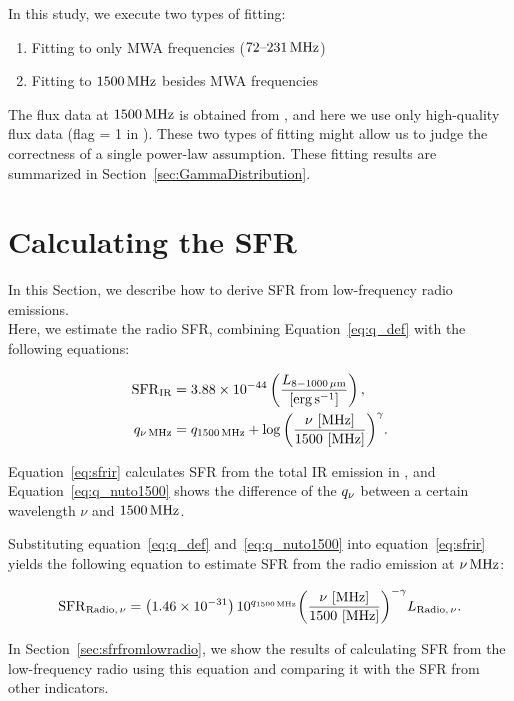In this study, we execute two types of fitting:

\begin{enumerate}
    \item Fitting to only MWA frequencies ($72\mbox{--}231\,\mathrm{MHz}$)
    \item Fitting to $1500\,\mathrm{MHz}$ besides MWA frequencies
\end{enumerate}

The flux data at $1500\,\mathrm{MHz}$ is obtained from \citet{Boselli2015}, and here we use only high-quality flux data (flag = 1 in \citealt{Boselli2015}).
These two types of fitting might allow us to judge the correctness of a single power-law assumption.
These fitting results are summarized in Section~\ref{sec:GammaDistribution}.



\section{Calculating the SFR}\label{sec:calculatingsfr}
In this Section, we describe how to derive SFR from low-frequency radio emissions.\\
Here, we estimate the radio SFR, combining Equation~\ref{eq:q_def} with the following equations:

\begin{align}
    \mathrm{SFR}_{\mathrm{IR}} &= 3.88 \times 10^{-44}\left(\frac{L_{\mathrm{8-1000\,\mu m}}}{\left[\mathrm{erg\,s^{-1}}\right]}\right)\label{eq:sfrir},\\
    q_{\nu\,\mathrm{MHz}} &= q_{\mathrm{1500\,\mathrm{MHz}}} + \log{\left(\frac{\nu\,\left[\mathrm{MHz}\right]}{1500\,\left[\mathrm{MHz}\right]}\right)}^{\gamma}\label{eq:q_nuto1500}.
\end{align}

Equation~\ref{eq:sfrir} calculates SFR from the total IR emission in \citet{Murphy2011}, and Equation~\ref{eq:q_nuto1500} shows the difference of the $q_{\nu}$ between a certain wavelength $\nu$ and $1500\,\mathrm{MHz}$.

Substituting equation~\ref{eq:q_def} and~\ref{eq:q_nuto1500} into equation~\ref{eq:sfrir} yields the following equation to estimate SFR from the radio emission at $\nu\,\mathrm{MHz}$:

\begin{equation}\label{eq:sfrfromradio}
    \mathrm{SFR}_{\mathrm{Radio},\,\nu} = \left(1.46\times10^{-31}\right) 10^{q_{\mathrm{1500\,\mathrm{MHz}}}} {\left(\frac{\nu\,\left[\mathrm{MHz}\right]}{1500\,\left[\mathrm{MHz}\right]}\right)}^{-\gamma} L_{\mathrm{Radio},\,\nu}.
\end{equation}

In Section~\ref{sec:sfrfromlowradio}, we show the results of calculating SFR from the low-frequency radio using this equation and comparing it with the SFR from other indicators.



%
%
